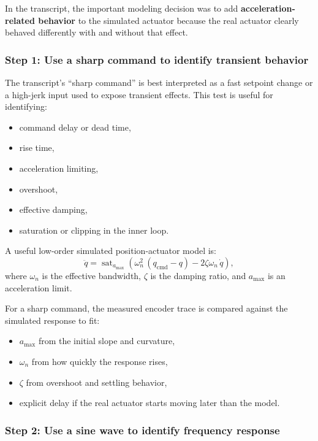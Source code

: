 \documentclass[11pt,a4paper]{article}
\begin{document}
In the transcript, the important modeling decision was to add
\textbf{acceleration-related behavior} to the simulated actuator because the
real actuator clearly behaved differently with and without that effect.

\subsubsection{Step 1: Use a sharp command to identify transient behavior}

The transcript's ``sharp command'' is best interpreted as a fast setpoint
change or a high-jerk input used to expose transient effects.  This test is
useful for identifying:
\begin{itemize}[leftmargin=2em]
      \item command delay or dead time,
      \item rise time,
      \item acceleration limiting,
      \item overshoot,
      \item effective damping,
      \item saturation or clipping in the inner loop.
\end{itemize}

A useful low-order simulated position-actuator model is:
\begin{equation}
      \ddot q = \operatorname{sat}_{a_{\max}}\!\left(
      \omega_n^2\,(q_{\mathrm{cmd}} - q)
      - 2\zeta\omega_n\,\dot q
      \right),
      \label{eq:actuator_second_order_sat}
\end{equation}
where $\omega_n$ is the effective bandwidth, $\zeta$ is the damping ratio,
and $a_{\max}$ is an acceleration limit.

For a sharp command, the measured encoder trace is compared against the
simulated response to fit:
\begin{itemize}[leftmargin=2em]
      \item $a_{\max}$ from the initial slope and curvature,
      \item $\omega_n$ from how quickly the response rises,
      \item $\zeta$ from overshoot and settling behavior,
      \item explicit delay if the real actuator starts moving later than the model.
\end{itemize}

\subsubsection{Step 2: Use a sine wave to identify frequency response}
\end{document}
